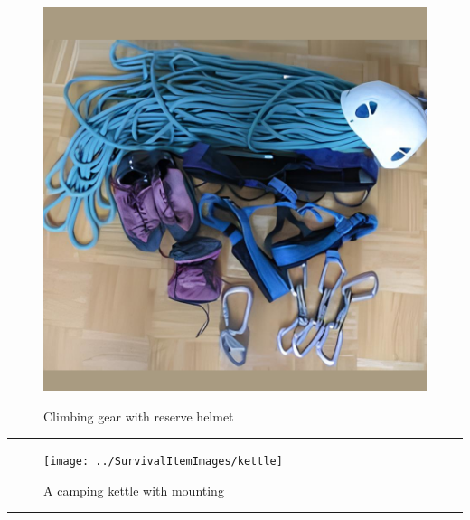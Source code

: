 \documentclass{article}
\begin{document}
    \begin{figure}[H]
        \centering
        \begin{minipage}{0.25\textwidth}
            \centering
            \includegraphics[width=\textwidth]{../SurvivalItemImages/climbinggear}
        \end{minipage}\hfill
        \begin{minipage}{0.7\textwidth}
            \centering
            \Large Climbing gear with reserve helmet
        \end{minipage}
    \end{figure}
    \vspace{-0.8em}
    \noindent\rule{\textwidth}{0.4pt}
            
    \begin{figure}[H]
        \centering
        \begin{minipage}{0.25\textwidth}
            \centering
            \texttt{[image: ../SurvivalItemImages/kettle]}
        \end{minipage}\hfill
        \begin{minipage}{0.7\textwidth}
            \centering
            \Large A camping kettle with mounting
        \end{minipage}
    \end{figure}
    \vspace{-0.8em}
    \noindent\rule{\textwidth}{0.4pt}
            
\end{document}
